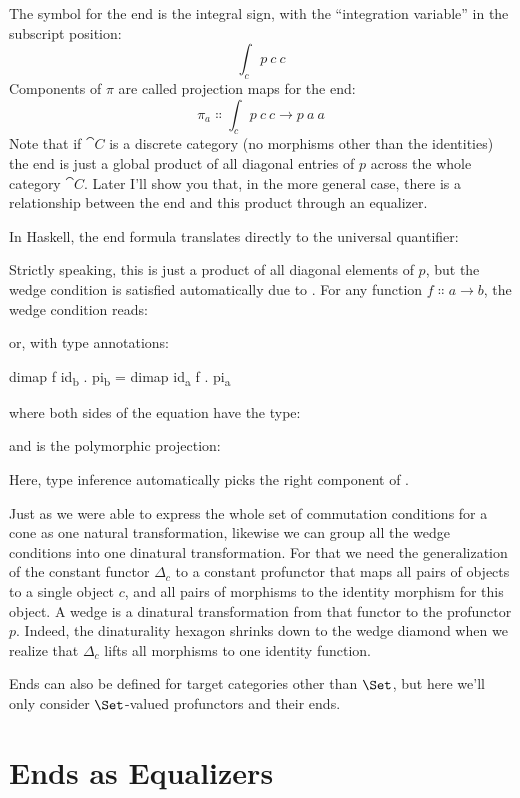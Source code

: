 \noindent
The symbol for the end is the integral sign, with the ``integration
variable'' in the subscript position:
\[\int_c p\ c\ c\]
Components of $\pi$ are called projection maps for the end:
\[\pi_a \Colon \int_c p\ c\ c \to p\ a\ a\]
Note that if $\cat{C}$ is a discrete category (no morphisms other than
the identities) the end is just a global product of all diagonal entries
of $p$ across the whole category $\cat{C}$. Later I'll show you
that, in the more general case, there is a relationship between the end
and this product through an equalizer.

In Haskell, the end formula translates directly to the universal
quantifier:

Strictly speaking, this is just a product of all diagonal elements of
$p$, but the wedge condition is satisfied automatically due to
. For any function
$f \Colon a \to b$, the wedge condition reads:

or, with type annotations:

\begin{snipv}
dimap f id\textsubscript{b} . pi\textsubscript{b} = dimap id\textsubscript{a} f . pi\textsubscript{a}
\end{snipv}
where both sides of the equation have the type:

and  is the polymorphic projection:

Here, type inference automatically picks the right component of
.

Just as we were able to express the whole set of commutation conditions
for a cone as one natural transformation, likewise we can group all the
wedge conditions into one dinatural transformation. For that we need the
generalization of the constant functor $\Delta_c$ to a constant
profunctor that maps all pairs of objects to a single object $c$,
and all pairs of morphisms to the identity morphism for this object. A
wedge is a dinatural transformation from that functor to the profunctor
$p$. Indeed, the dinaturality hexagon shrinks down to the wedge
diamond when we realize that $\Delta_c$ lifts all morphisms to one
identity function.

Ends can also be defined for target categories other than $\Set$,
but here we'll only consider $\Set$-valued profunctors and their
ends.

\section{Ends as Equalizers}

